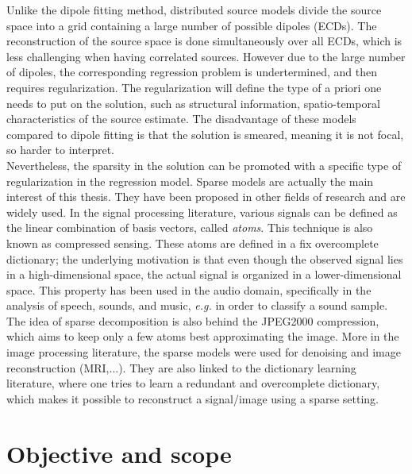 Unlike the dipole fitting method, distributed source models divide the source space into a grid containing a large number of possible dipoles (ECDs). The reconstruction of the source space is done simultaneously over all ECDs, which is less challenging when having correlated sources. However due to the large number of dipoles, the corresponding regression problem is undertermined, and then requires regularization. The regularization will define the type of a priori one needs to put on the solution, such as structural information, spatio-temporal characteristics of the source estimate. The disadvantage of these models compared to dipole fitting is that the solution is smeared, meaning it is not focal, so harder to interpret.\\

Nevertheless, the sparsity in the solution can be promoted with a specific type of regularization in the regression model. Sparse models are actually the main interest of this thesis. They have been proposed in other fields of research and are widely used. In the signal processing literature, various signals can be defined as the linear combination of basis vectors, called \textit{atoms}. This technique is also known as compressed sensing. These atoms are defined in a fix overcomplete dictionary; the underlying motivation is that even though the observed signal lies in a high-dimensional space, the actual signal is organized in a lower-dimensional space. This property has been used in the audio domain, specifically in the analysis of speech, sounds, and music, \textit{e.g.} in order to classify a sound sample. The idea of sparse decomposition is also behind the JPEG2000 compression, which aims to keep only a few atoms best approximating the image. More in the image processing literature, the sparse models were used for denoising and image reconstruction (\ac{MRI},...). They are also linked to the dictionary learning literature, where one tries to learn a redundant and overcomplete dictionary, which makes it possible to reconstruct a signal/image using a sparse setting.\\

\section{Objective and scope}


